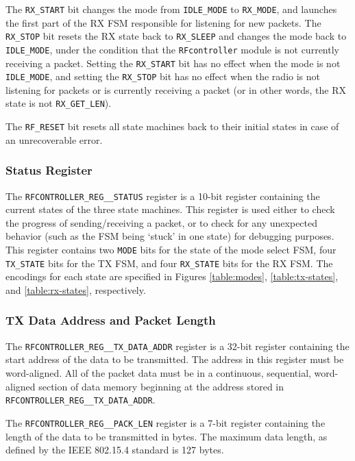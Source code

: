 The \texttt{RX\_START} bit changes the mode from \texttt{IDLE\_MODE} to \texttt{RX\_MODE}, and launches the first part of the RX FSM responsible for listening for new packets. The \texttt{RX\_STOP} bit resets the RX state back to \texttt{RX\_SLEEP} and changes the mode back to \texttt{IDLE\_MODE}, under the condition that the \texttt{RFcontroller} module is not currently receiving a packet. Setting the \texttt{RX\_START} bit has no effect when the mode is not \texttt{IDLE\_MODE}, and setting the \texttt{RX\_STOP} bit has no effect when the radio is not listening for packets or is currently receiving a packet (or in other words, the RX state is not \texttt{RX\_GET\_LEN}).

The \texttt{RF\_RESET} bit resets all state machines back to their initial states in case of an unrecoverable error.

\subsubsection{Status Register}
The \texttt{RFCONTROLLER\_REG\_\_STATUS} register is a 10-bit register containing the current states of the three state machines. This register is used either to check the progress of sending/receiving a packet, or to check for any unexpected behavior (such as the FSM being ‘stuck’ in one state) for debugging purposes. This register contains two \texttt{MODE} bits for the state of the mode select FSM, four \texttt{TX\_STATE} bits for the TX FSM, and four \texttt{RX\_STATE} bits for the RX FSM. The encodings for each state are specified in Figures \ref{table:modes}, \ref{table:tx-states}, and \ref{table:rx-states}, respectively.

\subsubsection{TX Data Address and Packet Length}
The \texttt{RFCONTROLLER\_REG\_\_TX\_DATA\_ADDR} register is a 32-bit register containing the start address of the data to be transmitted. The address in this register must be word-aligned. All of the packet data must be in a continuous, sequential, word-aligned section of data memory beginning at the address stored in \texttt{RFCONTROLLER\-\_REG\-\_\_TX\_DATA\_ADDR}.

The \texttt{RFCONTROLLER\_REG\_\_PACK\_LEN} register is a 7-bit register containing the length of the data to be transmitted in bytes. The maximum data length, as defined by the IEEE 802.15.4 standard \cite{15-4-standard} is 127 bytes.

